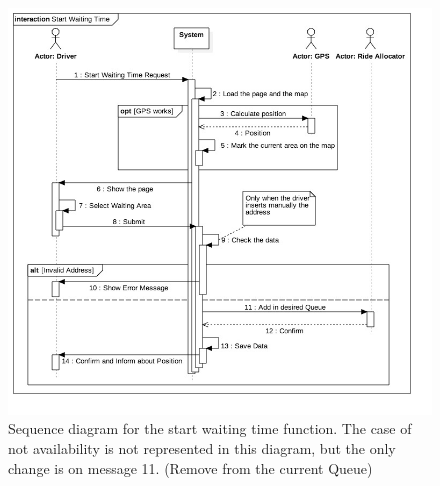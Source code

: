 \begin{figure}[h!]
	\centerline{\includegraphics[width=\paperwidth]{./figures/SD_StartWaitingTime.jpg}}
	\caption{Sequence diagram for the start waiting time function. The case of not availability is not represented in this diagram, but the only change is on message 11. (Remove from the current Queue)}
\end{figure}

\clearpage

